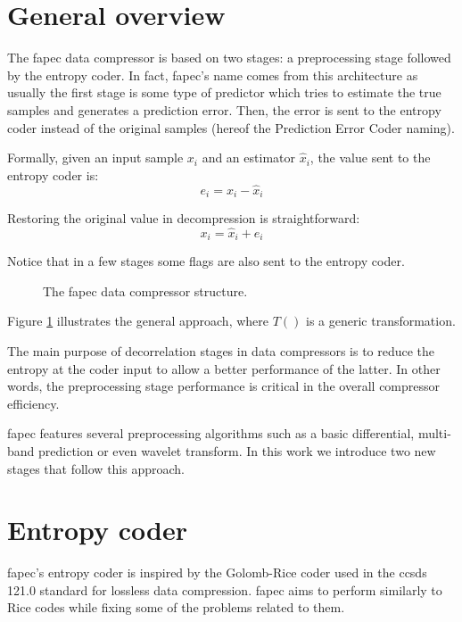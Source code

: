 \section{General overview}
The \acrshort{fapec} data compressor is based on two stages: a preprocessing stage followed by the entropy coder. In fact, \acrshort{fapec}'s name comes from this architecture as usually the first stage is some type of predictor which tries to estimate the true samples and generates a prediction error. Then, the error is sent to the entropy coder instead of the original samples (hereof the Prediction Error Coder naming).

Formally, given an input sample $x_i$ and an estimator $\hat{x}_i$, the value sent to the entropy coder is:
\begin{equation}
e_i = x_i - \hat{x}_i
\end{equation}

Restoring the original value in decompression is straightforward:
\begin{equation}
x_i = \hat{x}_i + e_i
\end{equation}

Notice that in a few stages some flags are also sent to the entropy coder.

\begin{figure}[h!]
	\begin{center}
		\scalebox{.615}{}
	\end{center}
	\caption{The \acrshort{fapec} data compressor structure.}
	\label{fig:fapec_structure}
\end{figure}

Figure \ref{fig:fapec_structure} illustrates the general approach, where $T()$ is a generic transformation.

The main purpose of decorrelation stages in data compressors is to reduce the entropy at the coder input to allow a better performance of the latter. In other words, the preprocessing stage performance is critical in the overall compressor efficiency.

\acrshort{fapec} features several preprocessing algorithms such as a basic differential, multi-band prediction or even wavelet transform. In this work we introduce two new stages that follow this approach.

\section{Entropy coder} \label{sec:entropy_coder}
\acrshort{fapec}'s entropy coder is inspired by the Golomb-Rice coder used in the \acrshort{ccsds} 121.0 standard for lossless data compression. \acrshort{fapec} aims to perform similarly to Rice codes while fixing some of the problems related to them.


